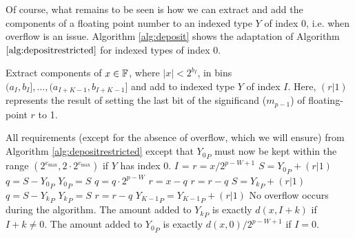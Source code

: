       Of course, what remains to be seen is how we can extract and add the
      components of a floating point number to an indexed type $Y$ of index 0,
      i.e. when overflow is an issue. Algorithm \ref{alg:deposit} shows the
      adaptation of Algorithm $\ref{alg:depositrestricted}$ for indexed types
      of index 0.

      \begin{samepage}
      \begin{alg}
        Extract components of $x \in \mathbb{F}$, where $|x| < 2^{b_I}$,
        in bins $(a_I,b_I], \ldots, (a_{I + K - 1}, b_{I + K - 1}]$
        and add to indexed type $Y$ of index $I$. Here, $(r | 1)$ represents
        the result of setting the last bit of the significand ($m_{p - 1}$) of
        floating-point $r$ to 1.
        \begin{algorithmic}[1]
          \Require
            \Statex All requirements (except for the absence of overflow, which we will ensure)
            from Algorithm \ref{alg:depositrestricted} except that ${Y_0}_P$
            must now be kept within the range $(2^{e_{\max}}, 2 \cdot 2^{e_{\max}})$ if $Y$ has index 0.
            \State $I$ = 
              \State $r = x / 2^{p - W + 1}$ \label{alg:deposit:scaler}
              \State $S = {Y_0}_P + (r | 1)$ \label{alg:deposit:formS}
              \State $q = S - {Y_0}_P$ \label{alg:deposit:formq}
              \State ${Y_0}_P = S$
              \State $q = q \cdot 2^{p - W}$ \label{alg:deposit:scaleq}
              \State $r = x - q$ \label{alg:deposit:formr}
              \State $r = r - q$ \label{alg:deposit:formragain}
                \State $S = {Y_k}_P + (r | 1)$
                \State $q = S - {Y_k}_P$
                \State ${Y_k}_P = S$
                \State $r = r - q$
              \EndFor
              \State ${Y_{K - 1}}_P = {Y_{K - 1}}_P + (r | 1)$
            \Else
              \State{} \label{alg:deposit:callrestricted}
            \EndIf
          \EndFunction
          \Ensure
            \Statex No overflow occurs during the algorithm.
            \Statex The amount added to ${Y_k}_P$ is exactly $d(x, I + k)$ if $I + k \neq 0$.
            \Statex The amount added to ${Y_0}_P$ is exactly $d(x, 0)/2^{p - W + 1}$ if $I = 0$.
        \end{algorithmic}
        \label{alg:deposit}
      \end{alg}
      \end{samepage}

